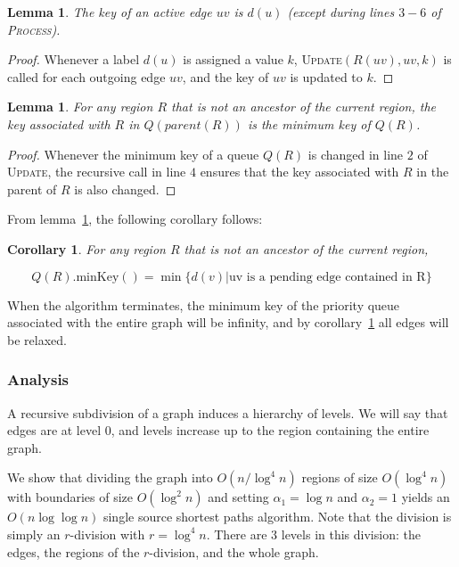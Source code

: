 \documentclass[12pt]{article}
\newtheorem{corollary}{Corollary}[theorem]
\newtheorem{lemma}[theorem]{Lemma}
\begin{document}
\begin{lemma}
  The key of an active edge $uv$ is $d(u)$ (except during lines $3-6$ of \textsc{Process}).
\end{lemma}

\begin{proof}
  Whenever a label $d(u)$ is assigned a value $k$, \textsc{Update}$(R(uv),uv,k)$ is called for each outgoing edge $uv$, and the key of $uv$ is updated to $k$.
\end{proof}

\begin{lemma}
  \label{lemma:invariant}
  For any region $R$ that is not an ancestor of the current region, the key associated with $R$ in $Q(parent(R))$ is the minimum key of $Q(R)$.
\end{lemma}

\begin{proof}
  Whenever the minimum key of a queue $Q(R)$ is changed in line $2$ of \textsc{Update}, the recursive call in line $4$ ensures that the key associated with $R$ in the parent of $R$ is also changed.
\end{proof}

From lemma~\ref{lemma:invariant}, the following corollary follows:\\

\begin{corollary}
\label{cor:relaxed}
  For any region $R$ that is not an ancestor of the current region,

  \[
    Q(R).\text{minKey}() = \min \{ d(v) | \text{uv is a pending edge contained in R} \}
  \]
\end{corollary}

When the algorithm terminates, the minimum key of the priority queue associated with the entire graph will be infinity, and by corollary~\ref{cor:relaxed} all edges will be relaxed.

\subsubsection{Analysis}
\label{sec:analysis}

A recursive subdivision of a graph induces a hierarchy of levels. We will say that edges are at level $0$, and levels increase up to the region containing the entire graph.

We show that dividing the graph into $O(n/\log^4n)$ regions of size $O(\log^4 n)$ with boundaries of size $O(\log^2 n)$ and setting $\alpha_1 = \log n$ and $\alpha_2 = 1$ yields an $O(n \log \log n)$ single source shortest paths algorithm. Note that the division is simply an $r$-division with $r=\log^4 n$. There are $3$ levels in this division: the edges, the regions of the $r$-division, and the whole graph.
\end{document}
